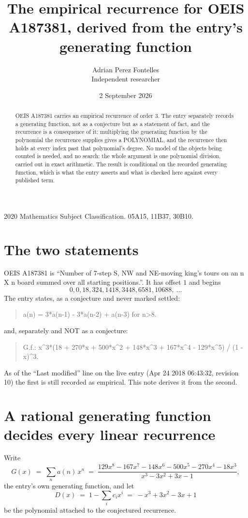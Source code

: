 \documentclass[11pt,a4paper]{article}
\title{The empirical recurrence for OEIS A187381, derived from the entry's generating function}
\author{Adrian Perez Fontelles\\ \small Independent researcher}
\date{2 September 2026}
\theoremstyle{plain}
\theoremstyle{definition}
\begin{document}
\maketitle

\begin{abstract}
OEIS A187381 carries an empirical recurrence of order $3$. The entry separately records a
generating function, not as a conjecture but as a statement of fact, and the recurrence is a
consequence of it: multiplying the generating function by the polynomial the recurrence
supplies gives a POLYNOMIAL, and the recurrence then holds at every index past that
polynomial's degree. No model of the objects being counted is needed, and no search: the
whole argument is one polynomial division, carried out in exact arithmetic. The result is
conditional on the recorded generating function, which is what the entry asserts and what is
checked here against every published term.
\end{abstract}

\noindent\small 2020 Mathematics Subject Classification. 05A15, 11B37, 30B10.\normalsize

\section{The two statements}

OEIS A187381 is ``Number of 7-step S, NW and NE-moving king's tours on an n X n board summed over all starting positions.''. It has offset $1$ and begins
\[
0, 0, 18, 324, 1418, 3448, 6581, 10688,\ \dots
\]
The entry states, as a conjecture and never marked settled:
\begin{quote}
a(n) = 3*a(n-1) - 3*a(n-2) + a(n-3) for n>8.
\end{quote}
and, separately and NOT as a conjecture:
\begin{quote}
G.f.: x\^{}3*(18 + 270*x + 500*x\^{}2 + 148*x\^{}3 + 167*x\^{}4 - 129*x\^{}5) / (1 - x)\^{}3.
\end{quote}
As of the ``Last modified'' line on the live entry (Apr 24 2018 06:43:32, revision 10) the first is still
recorded as empirical. This note derives it from the second.

\section{A rational generating function decides every linear recurrence}

Write
\[
G(x)\;=\;\sum_{n}a(n)\,x^{n}\;=\;\frac{129 x^{8} - 167 x^{7} - 148 x^{6} - 500 x^{5} - 270 x^{4} - 18 x^{3}}{x^{3} - 3 x^{2} + 3 x - 1},
\]
the entry's own generating function, and let
\[
D(x)\;=\;1-\sum_i c_i x^{i}\;=\;- x^{3} + 3 x^{2} - 3 x + 1
\]
be the polynomial attached to the conjectured recurrence.
\end{document}

